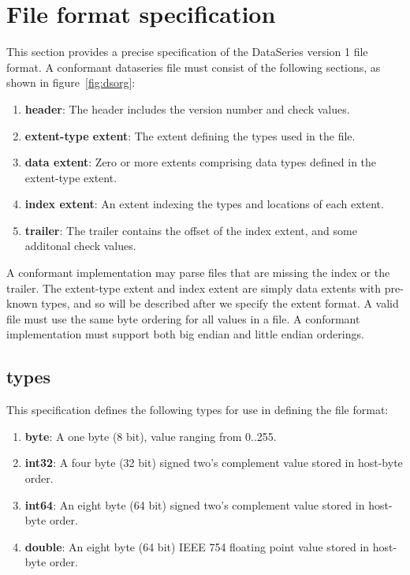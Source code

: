\section{File format specification}

\newcommand{\packFieldOrdering}{{\tt pack\_field\_ordering}\xspace}

This section provides a precise specification of the DataSeries
version 1 file format.  A conformant dataseries file must consist of
the following sections, as shown in figure~\ref{fig:dsorg}:

\begin{enumerate}
\item {\bf header}: The header includes the version number and check values.
\item {\bf extent-type extent}: The extent defining the types used in the file.
\item {\bf data extent}: Zero or more extents comprising data types defined in the extent-type extent.
\item {\bf index extent}: An extent indexing the types and locations of each extent.
\item {\bf trailer}: The trailer contains the offset of the index extent, and some additonal check values.
\end{enumerate}

A conformant implementation may parse files that are missing the index
or the trailer.  The extent-type extent and index extent are simply
data extents with pre-known types, and so will be described after we
specify the extent format.  A valid file must use the same byte
ordering for all values in a file.  A conformant implementation must
support both big endian and little endian orderings.

\subsection{types}

This specification defines the following types for use in defining the file format:

\begin{enumerate}
\item {\bf byte}: A one byte (8 bit), value ranging from 0..255.
\item {\bf int32}: A four byte (32 bit) signed two's complement value stored in host-byte order.
\item {\bf int64}: An eight byte (64 bit) signed two's complement value stored in host-byte order.
\item {\bf double}: An eight byte (64 bit) IEEE 754 floating point value stored in host-byte order.
\end{enumerate}

